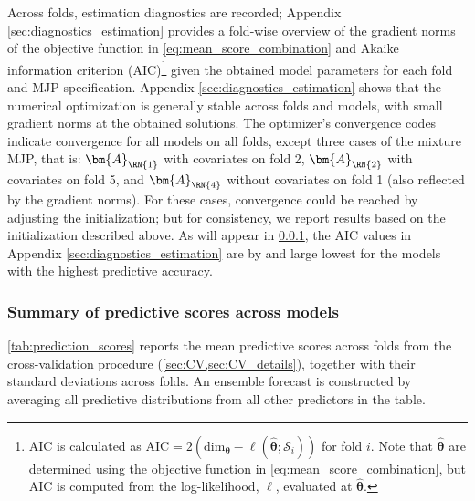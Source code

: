 Across folds, estimation diagnostics are recorded; Appendix \ref{sec:diagnostics_estimation} provides a fold-wise overview of the gradient norms of the objective function in \cref{eq:mean_score_combination} and Akaike information criterion (AIC)\footnote{AIC is calculated as $\text{AIC} = 2 (\text{dim}_{\bm \theta} - \ell (\widehat{\bm \theta}  ; \mathcal{S}_i) )$ for fold $i$. Note that $\widehat{\bm \theta}$ are determined using the objective function in \cref{eq:mean_score_combination}, but AIC is computed from the log-likelihood, $\ell$, evaluated at $\widehat{\bm\theta}$.} given the obtained model parameters for each fold and MJP specification.
Appendix \ref{sec:diagnostics_estimation} shows that the numerical optimization is generally stable across folds and models, with small gradient norms at the obtained solutions. The optimizer’s convergence codes indicate convergence for all models on all folds, except three cases of the mixture MJP, that is: \(\bm{A}_{\RN{1}}\) with covariates on fold 2, \(\bm{A}_{\RN{2}}\) with covariates on fold 5, and \(\bm{A}_{\RN{4}}\) without covariates on fold 1 (also reflected by the gradient norms). For these cases, convergence could be reached by adjusting the initialization; but for consistency, we report results based on the initialization described above. As will appear in \cref{sec:prediction_scores_tables}, the AIC values in Appendix \ref{sec:diagnostics_estimation} are by and large lowest for the models with the highest predictive accuracy.

\subsubsection{Summary of predictive scores across models} \label{sec:prediction_scores_tables}
\cref{tab:prediction_scores} reports the mean predictive scores across folds from the cross-validation procedure (\cref{sec:CV,sec:CV_details}), together with their standard deviations across folds.
An ensemble forecast is constructed by averaging all predictive distributions from all other predictors in the table.




